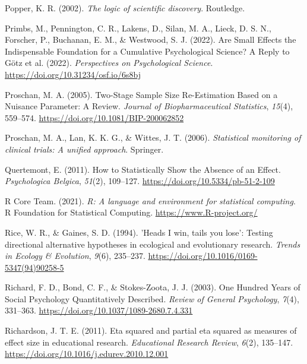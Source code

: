 \documentclass[
  oneside]{krantz}
\newlength{\cslhangindent}
\newlength{\cslentryspacingunit} %
\newenvironment{CSLReferences}[2] %
 {%
  \setlength{\parindent}{0pt}
  \ifodd #1
  \let\oldpar\par
  \def\par{\hangindent=\cslhangindent\oldpar}
  \fi
  \setlength{\parskip}{#2\cslentryspacingunit}
 }%
 {}
\begin{document}
\begin{CSLReferences}{1}{0}
\leavevmode{}%
Popper, K. R. (2002). \emph{{The logic of scientific discovery}}.
{Routledge}.

\leavevmode{}%
Primbs, M., Pennington, C. R., Lakens, D., Silan, M. A., Lieck, D. S.
N., Forscher, P., Buchanan, E. M., \& Westwood, S. J. (2022). Are {Small
Effects} the {Indispensable Foundation} for a {Cumulative Psychological
Science}? {A Reply} to {Götz} et al. (2022). \emph{Perspectives on
Psychological Science}. \url{https://doi.org/10.31234/osf.io/6s8bj}

\leavevmode{}%
Proschan, M. A. (2005). Two-{Stage Sample Size Re-Estimation Based} on a
{Nuisance Parameter}: {A Review}. \emph{Journal of Biopharmaceutical
Statistics}, \emph{15}(4), 559--574.
\url{https://doi.org/10.1081/BIP-200062852}

\leavevmode{}%
Proschan, M. A., Lan, K. K. G., \& Wittes, J. T. (2006).
\emph{Statistical monitoring of clinical trials: A unified approach}.
{Springer}.

\leavevmode{}%
Quertemont, E. (2011). How to {Statistically Show} the {Absence} of an
{Effect}. \emph{Psychologica Belgica}, \emph{51}(2), 109--127.
\url{https://doi.org/10.5334/pb-51-2-109}

\leavevmode{}%
R Core Team. (2021). \emph{R: A language and environment for statistical
computing}. R Foundation for Statistical Computing.
\url{https://www.R-project.org/}

\leavevmode{}%
Rice, W. R., \& Gaines, S. D. (1994). '{Heads I} win, tails you lose':
Testing directional alternative hypotheses in ecological and
evolutionary research. \emph{Trends in Ecology \& Evolution},
\emph{9}(6), 235--237.
\url{https://doi.org/10.1016/0169-5347(94)90258-5}

\leavevmode{}%
Richard, F. D., Bond, C. F., \& Stokes-Zoota, J. J. (2003). One {Hundred
Years} of {Social Psychology Quantitatively Described}. \emph{Review of
General Psychology}, \emph{7}(4), 331--363.
\url{https://doi.org/10.1037/1089-2680.7.4.331}

\leavevmode{}%
Richardson, J. T. E. (2011). Eta squared and partial eta squared as
measures of effect size in educational research. \emph{Educational
Research Review}, \emph{6}(2), 135--147.
\url{https://doi.org/10.1016/j.edurev.2010.12.001}


\end{CSLReferences}
\end{document}
